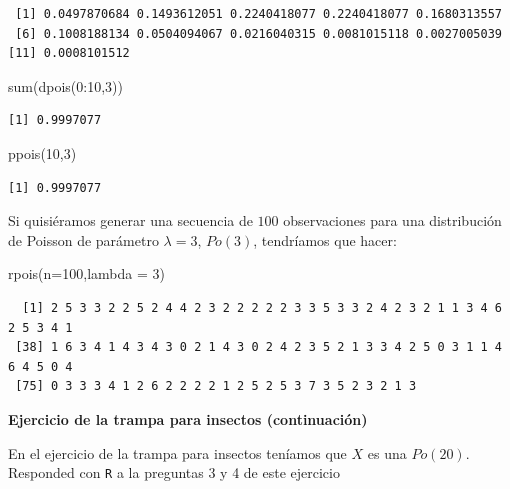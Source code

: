 \documentclass[
  letterpaper,
  DIV=11,
  numbers=noendperiod]{scrreprt}
\newenvironment{Shaded}{\begin{snugshade}}{\end{snugshade}}
\newcommand{\AttributeTok}[1]{\textcolor[rgb]{0.40,0.45,0.13}{#1}}
\newcommand{\DecValTok}[1]{\textcolor[rgb]{0.68,0.00,0.00}{#1}}
\newcommand{\FunctionTok}[1]{\textcolor[rgb]{0.28,0.35,0.67}{#1}}
\newcommand{\NormalTok}[1]{\textcolor[rgb]{0.00,0.23,0.31}{#1}}
\newcommand{\SpecialCharTok}[1]{\textcolor[rgb]{0.37,0.37,0.37}{#1}}
\begin{document}
\begin{verbatim}
 [1] 0.0497870684 0.1493612051 0.2240418077 0.2240418077 0.1680313557
 [6] 0.1008188134 0.0504094067 0.0216040315 0.0081015118 0.0027005039
[11] 0.0008101512
\end{verbatim}

\begin{Shaded}
\begin{Highlighting}[]
\FunctionTok{sum}\NormalTok{(}\FunctionTok{dpois}\NormalTok{(}\DecValTok{0}\SpecialCharTok{:}\DecValTok{10}\NormalTok{,}\DecValTok{3}\NormalTok{))}
\end{Highlighting}
\end{Shaded}

\begin{verbatim}
[1] 0.9997077
\end{verbatim}

\begin{Shaded}
\begin{Highlighting}[]
\FunctionTok{ppois}\NormalTok{(}\DecValTok{10}\NormalTok{,}\DecValTok{3}\NormalTok{)}
\end{Highlighting}
\end{Shaded}

\begin{verbatim}
[1] 0.9997077
\end{verbatim}

Si quisiéramos generar una secuencia de \(100\) observaciones para una
distribución de Poisson de parámetro \(\lambda=3\), \(Po(3)\),
tendríamos que hacer:

\begin{Shaded}
\begin{Highlighting}[]
\FunctionTok{rpois}\NormalTok{(}\AttributeTok{n=}\DecValTok{100}\NormalTok{,}\AttributeTok{lambda =} \DecValTok{3}\NormalTok{)}
\end{Highlighting}
\end{Shaded}

\begin{verbatim}
  [1] 2 5 3 3 2 2 5 2 4 4 2 3 2 2 2 2 2 3 3 5 3 3 2 4 2 3 2 1 1 3 4 6 2 5 3 4 1
 [38] 1 6 3 4 1 4 3 4 3 0 2 1 4 3 0 2 4 2 3 5 2 1 3 3 4 2 5 0 3 1 1 4 6 4 5 0 4
 [75] 0 3 3 3 4 1 2 6 2 2 2 2 1 2 5 2 5 3 7 3 5 2 3 2 1 3
\end{verbatim}

\textbf{Ejercicio de la trampa para insectos (continuación)}

En el ejercicio de la trampa para insectos teníamos que \(X\) es una
\(Po(20)\). Responded con \texttt{R} a la preguntas 3 y 4 de este
ejercicio
\end{document}
